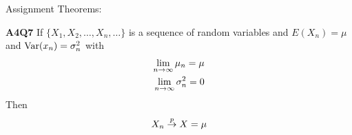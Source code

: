 \documentclass[16pt,a4paper]{article}
\begin{document}
Assignment Theorems: 
\begin{thm}{\textbf{A4Q7}}
    If $\{X_1, X_2, \ldots, X_n, \ldots\}$ is a sequence of random variables and $E(X_n) = \mu$ and $\mathrm{Var}(x_n) = \sigma_n^2$ with 
    \begin{align*}
        \lim\limits_{n \rightarrow \infty} \mu_n = \mu\\
        \lim\limits_{n \rightarrow \infty} \sigma_n^2 = 0\\
    \end{align*}
    Then
    \begin{align*}
        X_n \overset{p}{\to} X = \mu
    \end{align*}
\end{thm}
\end{document}
